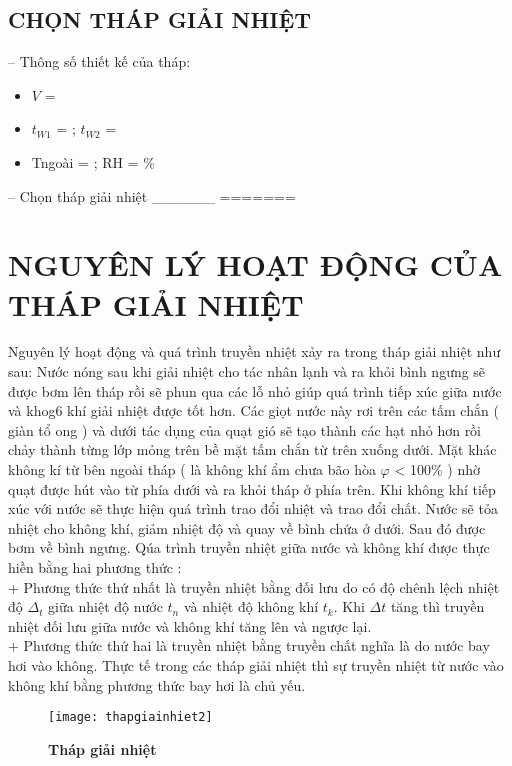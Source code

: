 \subsection{CHỌN THÁP GIẢI NHIỆT}
-- Thông số thiết kế của tháp:
\begin{itemize}
	\item $V$ = 
	\item $t_{W1}$ = ; $t_{W2}$ = 
	\item T{\scriptsize ngoài} = ; RH = \%
\end{itemize}

-- Chọn tháp giải nhiệt \_\_\_\_\_\_
=======

\section{NGUYÊN LÝ HOẠT ĐỘNG CỦA THÁP GIẢI NHIỆT}

Nguyên lý hoạt động và quá trình truyền nhiệt xảy ra trong tháp giải nhiệt như sau: Nước nóng sau khi giải nhiệt cho tác nhân lạnh và ra khỏi bình ngưng sẽ được bơm lên tháp rồi sẽ phun qua các lỗ nhỏ giúp quá trình tiếp xúc giữa nước và khog6 khí giải nhiệt được tốt hơn. Các giọt nước này rơi trên các tấm chắn ( giàn tổ ong ) và dưới tác dụng của quạt gió sẽ tạo thành các hạt nhỏ hơn rồi chảy thành từng lớp mỏng trên bề mặt tấm chắn từ trên xuống dưới. Mặt khác không kí từ bên ngoài tháp ( là không khí ẩm chưa bão hòa $\varphi$ < 100\% ) nhờ quạt được hút vào từ phía dưới và ra khỏi tháp ở phía trên. Khi không khí tiếp xúc với nước sẽ thực hiện quá trình trao đổi nhiệt và trao đổi chất. Nước sẽ tỏa nhiệt cho không khí, giảm nhiệt độ và quay về bình chứa ở dưới. Sau đó được bơm về bình ngưng. Qúa trình truyền nhiệt giữa nước và không khí được thực hiền bằng hai phương thức : \\
+ Phương thức thứ nhất là truyền nhiệt bằng đối lưu do có độ chênh lệch nhiệt độ $\Delta_{t}$ giữa nhiệt độ nước $t_{n}$ và nhiệt độ không khí $t_{k}$. Khi $\Delta t$ tăng thì truyền nhiệt đối lưu giữa nước và không khí tăng lên và ngược lại.\\
+ Phương thức thứ hai là truyền nhiệt bằng truyền chất nghĩa là do nước bay hơi vào không. Thực tế trong các tháp giải nhiệt thì sự truyền nhiệt từ nước vào không khí bằng phương thức bay hơi là chủ yếu.\\

\begin{figure}[H]
	\centering
	\texttt{[image: thapgiainhiet2]}
	\caption{\textbf{Tháp giải nhiệt}}
	\label{thapgiainhiet2}
\end{figure}

